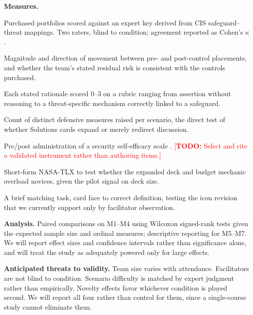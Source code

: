 \documentclass[10pt,twocolumn,letterpaper]{article}
\newcommand{\todo}[1]{\textcolor{red}{[\textbf{TODO:} #1]}}
\begin{document}
\textbf{Measures.}
\begin{description}[leftmargin=1em,style=nextline]
\item[M1. Control-selection appropriateness.] Purchased portfolios scored
against an expert key derived from CIS safeguard--threat mappings. Two raters,
blind to condition; agreement reported as Cohen's $\kappa$
\cite{landis1977kappa}.
\item[M2. Risk-matrix delta.] Magnitude and direction of movement between
pre- and post-control placements, and whether the team's stated residual risk
is consistent with the controls purchased.
\item[M3. Justification quality.] Each stated rationale scored 0--3 on a rubric
ranging from assertion without reasoning to a threat-specific mechanism
correctly linked to a safeguard.
\item[M4. Mitigation breadth.] Count of distinct defensive measures raised per
scenario, the direct test of whether Solutions cards expand or merely redirect
discussion.
\item[M5. Self-efficacy.] Pre/post administration of a security self-efficacy
scale \cite{bandura1997selfefficacy}.
\todo{Select and cite a validated instrument rather than authoring items.}
\item[M6. Cognitive load.] Short-form NASA-TLX \cite{hart1988nasatlx} to test
whether the expanded deck and budget mechanic overload novices, given the
pilot signal on deck size.
\item[M7. Card comprehension.] A brief matching task, card face to correct
definition, testing the icon revision that we currently support only by
facilitator observation.
\end{description}

\textbf{Analysis.} Paired comparisons on M1--M4 using Wilcoxon signed-rank tests
given the expected sample size and ordinal measures; descriptive reporting for
M5--M7. We will report effect sizes and confidence intervals rather than
significance alone, and will treat the study as adequately powered only for
large effects.

\textbf{Anticipated threats to validity.} Team size varies with attendance.
Facilitators are not blind to condition. Scenario difficulty is matched by
expert judgment rather than empirically. Novelty effects favor whichever
condition is played second. We will report all four rather than control for
them, since a single-course study cannot eliminate them.

\end{document}
